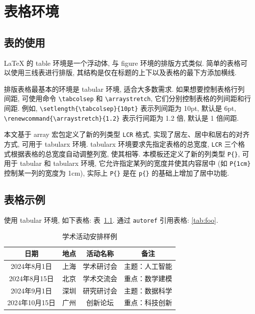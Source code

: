 

\chapter{表格环境}

\section{表的使用}

LaTeX 的 table 环境是一个浮动体, 与 figure 环境的排版方式类似. 简单的表格可以使用三线表进行排版, 其结构是仅在标题的上下以及表格的最下方添加横线.

排版表格最基本的环境是 tabular 环境, 适合大多数需求. 如果想要控制表格行列间距, 可使用命令 \verb|\tabcolsep| 和 \verb|\arraystretch|, 它们分别控制表格的列间距和行间距. 例如, \verb|\setlength{\tabcolsep}{10pt}| 表示列间距为 10pt, 默认是 6pt, \verb|\renewcommand{\arraystretch}{1.2}| 表示行间距为 1.2 倍, 默认是 1 倍间距.

本文基于 array 宏包定义了新的列类型 \verb|LCR| 格式, 实现了居左、居中和居右的对齐方式, 可用于 tabularx 环境. tabularx 环境要求先指定表格的总宽度, \verb|LCR| 三个格式根据表格的总宽度自动调整列宽, 使其相等. 本模板还定义了新的列类型 \verb|P{}|, 可用于 tabular 和 tabularx 环境, 它允许指定某列的宽度并使其内容居中 (如 \verb|P{1cm}| 控制某一列的宽度为 1cm), 实际上 \verb|P{}| 是在 \verb|p{}| 的基础上增加了居中功能.


\section{表格示例}

使用 tabular 环境, 如下表格: 表~\ref{tab:foo}. 通过 \verb|autoref| 引用表格: \autoref{tab:foo}.

\begin{table}[htp!]
\centering
\setlength{\tabcolsep}{12pt}  %
\renewcommand{\arraystretch}{1.2}
\caption{学术活动安排样例}
\label{tab:foo}
\begin{tabular}{|c|c|c|c|}
\hline
\textbf{日期}  & \textbf{地点} & \textbf{活动名称} & \textbf{备注} \\ \hline
2024年8月1日      & 上海       & 学术研讨会      & 主题：人工智能 \\ \hline
2024年8月15日    & 北京       & 学术交流会      & 重点：数学建模 \\ \hline
2024年9月1日      & 深圳       & 研究研讨会      & 主题：数据科学 \\ \hline
2024年10月15日  & 广州       & 创新论坛         & 重点：科技创新 \\ \hline
\end{tabular}
\end{table}

